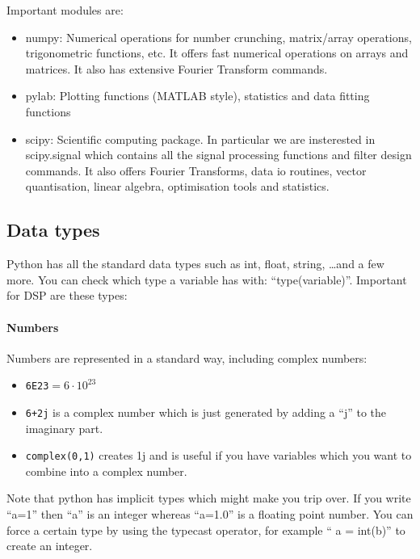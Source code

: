 \documentclass[12pt,a4paper]{article}
\begin{document}
Important modules are:
\begin{itemize}
\item numpy: Numerical operations for number crunching, matrix/array
  operations, trigonometric functions, etc. It offers fast numerical
  operations on arrays and matrices. It also has extensive Fourier
  Transform commands.
\item pylab: Plotting functions (MATLAB style), statistics and data fitting functions
\item scipy: Scientific computing package. In particular we are insterested in
  scipy.signal which contains all the signal processing functions and
  filter design commands. It also offers Fourier Transforms, data io routines,
  vector quantisation, linear algebra, optimisation tools and statistics.
\end{itemize}


\subsection{Data types}
Python has all the standard data types such as int, float, string,
\ldots and a few more. You can check which type a variable has with:
``type(variable)''. Important for DSP are these types:

\paragraph{Numbers}
Numbers are represented in a standard way, including complex numbers:
\begin{itemize}
\item \texttt{6E23}$=6\cdot 10^{23}$
\item \texttt{6+2j} is a complex number which is just generated
  by adding a ``j'' to the imaginary part.
\item \texttt{complex(0,1)} creates 1j and is useful if you have
  variables which you want to combine into a complex number.
\end{itemize}
Note that python has implicit types which might make you trip
over. If you write ``a=1'' then ``a'' is an integer whereas
``a=1.0'' is a floating point number. You can force a certain type by using
the typecast operator, for example `` a = int(b)'' to create an integer.
\end{document}
